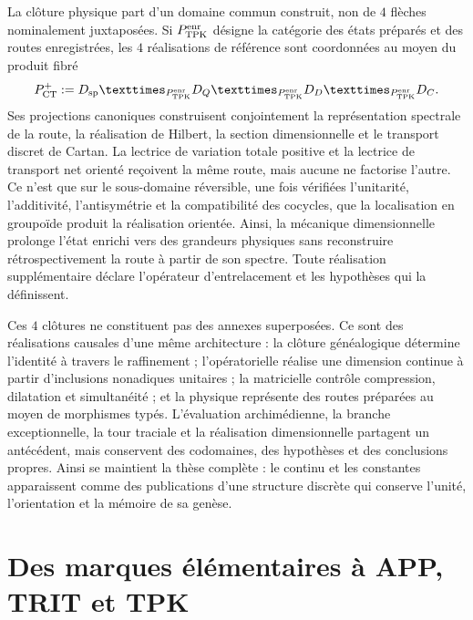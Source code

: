 La clôture physique part d'un domaine commun construit, non de \(4\) flèches
nominalement juxtaposées. Si \(\mathsf P_{\rm TPK}^{\rm enr}\) désigne la
catégorie des états préparés et des routes enregistrées, les \(4\) réalisations
de référence sont coordonnées au moyen du produit fibré
\[
 \mathsf P_{\rm CT}^{+}
 :=\mathsf D_{\rm sp}
 \times_{\mathsf P_{\rm TPK}^{\rm enr}}\mathsf D_Q
 \times_{\mathsf P_{\rm TPK}^{\rm enr}}\mathsf D_D
 \times_{\mathsf P_{\rm TPK}^{\rm enr}}\mathsf D_C.
\]
Ses projections canoniques construisent conjointement la représentation
spectrale de la route, la réalisation de Hilbert, la section dimensionnelle et le
transport discret de Cartan. La lectrice de variation totale positive et la
lectrice de transport net orienté reçoivent la même route, mais aucune ne
factorise l'autre. Ce n'est que sur le sous-domaine réversible, une fois vérifiées
l'unitarité, l'additivité, l'antisymétrie et la compatibilité des cocycles, que la
localisation en groupoïde produit la réalisation orientée. Ainsi, la
mécanique dimensionnelle prolonge l'état enrichi vers des grandeurs physiques
sans reconstruire rétrospectivement la route à partir de son spectre. Toute
réalisation supplémentaire déclare l'opérateur d'entrelacement et les hypothèses qui la définissent.

Ces \(4\) clôtures ne constituent pas des annexes superposées. Ce sont des réalisations
causales d'une même architecture : la clôture généalogique détermine
l'identité à travers le raffinement ; l'opératorielle réalise une dimension continue
à partir d'inclusions nonadiques unitaires ; la matricielle contrôle compression,
dilatation et simultanéité ; et la physique représente des routes préparées au moyen de
morphismes typés. L'évaluation archimédienne, la branche exceptionnelle, la tour
traciale et la réalisation dimensionnelle partagent un antécédent, mais conservent
des codomaines, des hypothèses et des conclusions propres. Ainsi se maintient la thèse
complète : le continu et les constantes apparaissent comme des publications d'une
structure discrète qui conserve l'unité, l'orientation et la mémoire de sa
genèse.

\section*{Des marques élémentaires à APP, TRIT et TPK}


